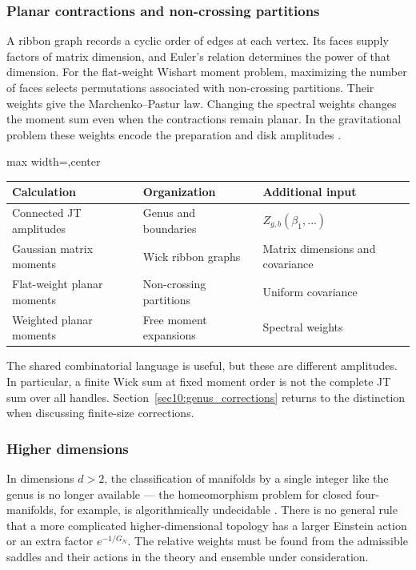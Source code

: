 \documentclass[11pt,letterpaper]{article}
\theoremstyle{plain}
\theoremstyle{definition}
\theoremstyle{remark}
\begin{document}
\subsubsection*{Planar contractions and non-crossing partitions}

A ribbon graph records a cyclic order of edges at each vertex. Its faces
supply factors of matrix dimension, and Euler's relation determines the
power of that dimension. For the flat-weight Wishart moment problem,
maximizing the number of faces selects permutations associated with
non-crossing partitions. Their weights give the Marchenko--Pastur law.
Changing the spectral weights changes the moment sum even when the
contractions remain planar. In the gravitational problem these weights
encode the preparation and disk amplitudes
\citep{pssyetal2022,wang2023,chengetal2024}.

\begin{center}
\begin{adjustbox}{max width=\textwidth,center}
\begin{tabular}{lll}
\toprule
\textbf{Calculation} & \textbf{Organization} & \textbf{Additional input} \\
\midrule
Connected JT amplitudes & Genus and boundaries & $Z_{g,b}(\beta_1,\ldots)$ \\
Gaussian matrix moments & Wick ribbon graphs & Matrix dimensions and covariance \\
Flat-weight planar moments & Non-crossing partitions & Uniform covariance \\
Weighted planar moments & Free moment expansions & Spectral weights \\
\bottomrule
\end{tabular}
\end{adjustbox}
\end{center}

The shared combinatorial language is useful, but these are different
amplitudes. In particular, a finite Wick sum at fixed moment order is not
the complete JT sum over all handles. Section~\ref{sec10:genus_corrections}
returns to the distinction when discussing finite-size corrections.

\subsubsection*{Higher dimensions}

In dimensions $d > 2$, the classification of manifolds by a single integer like
the genus is no longer available --- the homeomorphism problem for closed
four-manifolds, for example, is algorithmically undecidable
\citep{markov1958}.  There is no general rule that a more complicated higher-dimensional
topology has a larger Einstein action or an extra factor $e^{-1/G_N}$.
The relative weights must be found from the admissible saddles and their
actions in the theory and ensemble under consideration.
\end{document}

